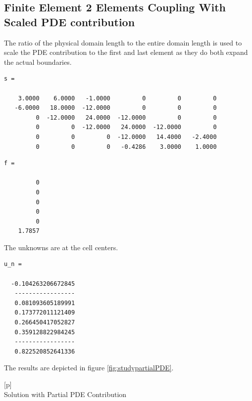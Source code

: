 \documentclass[a4paper,12pt]{article}
\makeatletter
\newenvironment{figurehere}
  {\def\@captype{figure}}
  {}
\makeatother
\begin{document}
\subsection{Finite Element 2 Elements Coupling With Scaled PDE contribution}
The ratio of the physical domain length to the entire domain length is used to scale the PDE contribution to the first and last element as they do both expand the actual boundaries.
\begin{verbatim}
s =

    3.0000    6.0000   -1.0000         0         0         0
   -6.0000   18.0000  -12.0000         0         0         0
         0  -12.0000   24.0000  -12.0000         0         0
         0         0  -12.0000   24.0000  -12.0000         0
         0         0         0  -12.0000   14.4000   -2.4000
         0         0         0   -0.4286    3.0000    1.0000
\end{verbatim}
\begin{verbatim}
f =

         0
         0
         0
         0
         0
    1.7857
\end{verbatim}
The unknowns are at the cell centers.
\begin{verbatim}
u_n =

  -0.104263206672845
   -----------------
   0.081093605189991
   0.173772011121409
   0.266450417052827
   0.359128822984245
   -----------------
   0.822520852641336
\end{verbatim}
The results are depicted in figure \ref{fig:studypartialPDE}.
\begin{center}
\begin{figurehere}[p]
\\
\caption{Solution with Partial PDE Contribution}\label{fig:studypartialPDE}
\end{figurehere}
\end{center}
\end{document}
